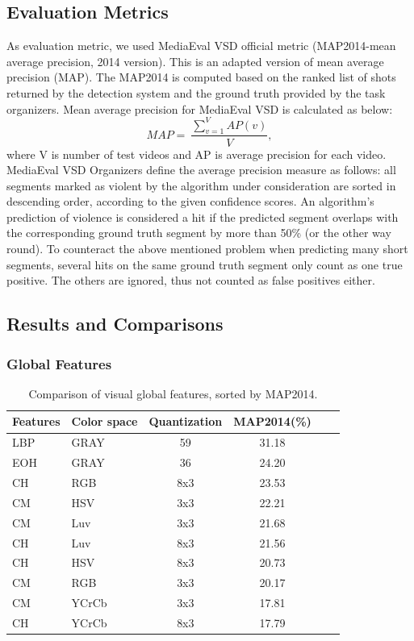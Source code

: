 \documentclass[twocolumn]{bmcart}%
\begin{document}
\subsection{Evaluation Metrics}
As evaluation metric, we used MediaEval VSD official metric (MAP2014-mean average precision, 2014 version). This is an adapted version of mean average precision (MAP). The MAP2014 is computed based on the ranked list of shots returned by the detection system and the ground truth provided by the task organizers. Mean average precision for MediaEval VSD  is calculated as below:
\[
MAP=\ \frac{\sum_{v=1}^VAP(v)}{V},
\]
where V is number of test videos and AP is average precision for each video. MediaEval VSD Organizers define the average precision measure as follows: all segments marked as violent by the algorithm under consideration are sorted in descending order, according to the given confidence scores. An algorithm’s prediction of violence is considered a hit if the predicted segment overlaps with the corresponding ground truth segment by more than 50\% (or the other way round). To counteract the above mentioned problem when predicting many short segments, several hits on the same ground truth segment only count as one true positive. The others are ignored, thus not counted as false positives either.
\subsection{Results and Comparisons}
\subsubsection{Global Features}
\begin{table}
	\centering
	\caption{Comparison of visual global features, sorted by MAP2014.}
	\setlength{\tabcolsep}{4pt}
	\begin{tabular}{llcccc}
		\hline
		Features & Color space & Quantization & MAP2014(\%) \\ \hline
		LBP & GRAY  & 59    & 31.18 \\
		EOH & GRAY   & 36    & 24.20 \\
		CH & RGB   & 8x3   & 23.53 \\
		CM & HSV     & 3x3   & 22.21 \\
		CM & Luv      & 3x3   & 21.68 \\
		CH & Luv    & 8x3   & 21.56 \\
		CH & HSV    & 8x3   & 20.73  \\
		CM & RGB     & 3x3   & 20.17 \\
		CM & YCrCb   & 3x3   & 17.81 \\
		CH & YCrCb   & 8x3   & 17.79 \\ \hline
	\end{tabular}%
	\label{tab:global}%
\end{table}%
\end{document}
